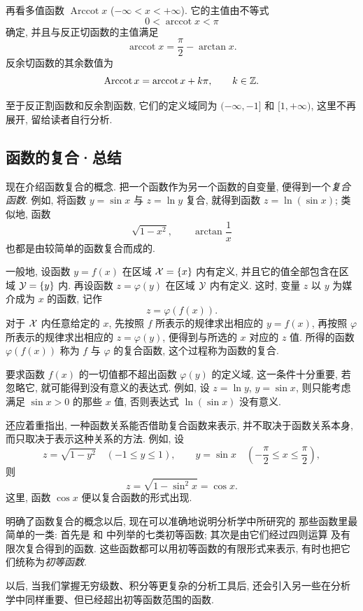 再看多值函数 $\operatorname{Arccot}x$ ($-\infty<x<+\infty$).
它的主值由不等式
$$
0<\operatorname{arccot}x<\pi
$$
确定, 并且与反正切函数的主值满足
$$
\operatorname{arccot}x=\frac{\pi}{2}-\arctan x.
$$
反余切函数的其余数值为
$$
\operatorname{Arccot}x=\operatorname{arccot}x+k\pi,\qquad k\in\mathbb{Z}.
$$

至于反正割函数和反余割函数, 它们的定义域同为 $(-\infty,-1]$ 和 $[1,+\infty)$,
这里不再展开, 留给读者自行分析.

\subsection{函数的复合·总结}\label{subsec:51}
现在介绍函数复合的概念.
把一个函数作为另一个函数的自变量, 便得到一个\emph{复合函数}.
例如, 将函数 $y=\sin x$ 与 $z=\ln y$ 复合, 就得到函数
$z=\ln(\sin x)$;
类似地, 函数
$$
\sqrt{1-x^2},\qquad \arctan\frac{1}{x}
$$
也都是由较简单的函数复合而成的.

一般地, 设函数 $y=f(x)$ 在区域 $\mathcal{X}=\{x\}$ 内有定义,
并且它的值全部包含在区域 $\mathcal{Y}=\{y\}$ 内.
再设函数 $z=\varphi(y)$ 在区域 $\mathcal{Y}$ 内有定义.
这时, 变量 $z$ 以 $y$ 为媒介成为 $x$ 的函数, 记作
$$
z=\varphi(f(x)).
$$
对于 $\mathcal{X}$ 内任意给定的 $x$, 先按照 $f$ 所表示的规律求出相应的
$y=f(x)$, 再按照 $\varphi$ 所表示的规律求出相应的 $z=\varphi(y)$,
便得到与所选的 $x$ 对应的 $z$ 值.
所得的函数 $\varphi(f(x))$ 称为 $f$ 与 $\varphi$ 的复合函数,
这个过程称为函数的复合.

要求函数 $f(x)$ 的一切值都不超出函数 $\varphi(y)$ 的定义域,
这一条件十分重要, 若忽略它, 就可能得到没有意义的表达式.
例如, 设 $z=\ln y$, $y=\sin x$, 则只能考虑满足
$\sin x>0$ 的那些 $x$ 值, 否则表达式 $\ln(\sin x)$ 没有意义.

还应着重指出, 一种函数关系能否借助复合函数来表示,
并不取决于函数关系本身, 而只取决于表示这种关系的方法.
例如, 设
$$
z=\sqrt{1-y^2}\quad(-1\leqslant y\leqslant 1),
\qquad
y=\sin x\quad\left(-\frac{\pi}{2}\leqslant x\leqslant\frac{\pi}{2}\right),
$$
则
$$
z=\sqrt{1-\sin^2x}=\cos x.
$$
这里, 函数 $\cos x$ 便以复合函数的形式出现.

明确了函数复合的概念以后, 现在可以准确地说明分析学中所研究的
那些函数里最简单的一类: 首先是  和
 中列举的七类初等函数; 其次是由它们经过四则运算
及有限次复合得到的函数.
这些函数都可以用初等函数的有限形式来表示, 有时也把它们统称为\emph{初等函数}.

以后, 当我们掌握无穷级数、积分等更复杂的分析工具后,
还会引入另一些在分析学中同样重要、但已经超出初等函数范围的函数.

